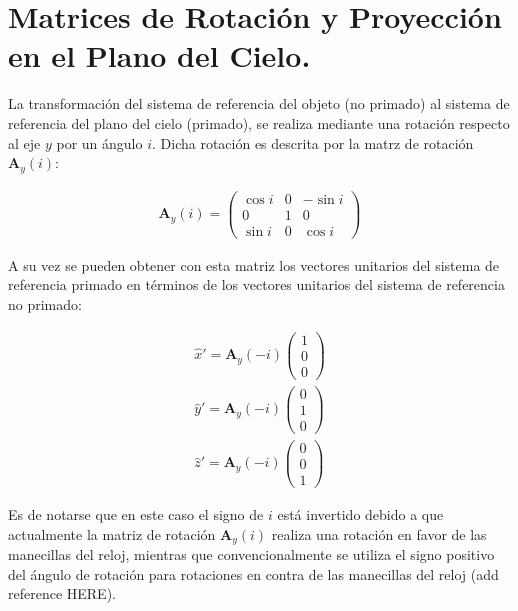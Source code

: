 \chapter[Matrices de Rotación]{Matrices de Rotación y Proyección en el Plano del Cielo.}
\label{app:matrix}
\thispagestyle{empty}
La transformación del sistema de referencia del objeto (no primado) al sistema de referencia del plano del cielo (primado), se realiza mediante una rotación respecto al eje $y$ por un ángulo $i$. Dicha rotación es descrita por la matrz de rotación $\mathbf{A}_y(i)$:

\begin{align}
  \mathbf{A}_y(i) = \left(
  \begin{array}{ccc}
    \cos i & 0 & -\sin i \\
    0      & 1 & 0       \\
    \sin i & 0 & \cos i
  \end{array}\right)
\end{align}

A su vez se pueden obtener con esta matriz los vectores unitarios del sistema de referencia primado en términos de los vectores unitarios del sistema de referencia no primado:

\begin{align}
  \hat{x}' = \mathbf{A}_y(-i)\left(
  \begin{array}{c}
    1 \\ 0 \\ 0
  \end{array}\right)\\
  \hat{y}' = \mathbf{A}_y(-i)\left(
  \begin{array}{c}
    0 \\ 1 \\ 0
  \end{array} \right)\\
  \hat{z}' = \mathbf{A}_y(-i)\left(
  \begin{array}{c}
    0 \\ 0 \\ 1
  \end{array}\right) \label{eq:y-matrix}
\end{align}

Es de notarse que en este caso el signo de $i$ está invertido debido a que actualmente la matriz de rotación $\mathbf{A}_y(i)$ realiza una rotación en favor de las manecillas del reloj, mientras que convencionalmente se utiliza el signo positivo del ángulo de rotación para rotaciones en contra de las manecillas del reloj (add reference HERE).

